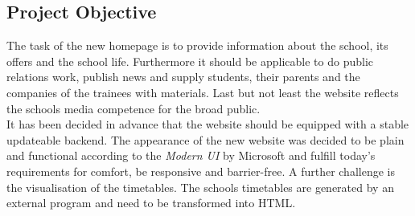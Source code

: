 \subsection{Project Objective}
\label{sec:ProjectObjective}
The task of the new homepage is to provide information about the school, its offers and the school life. 
Furthermore it should be applicable to do public relations work, publish news and supply students, 
their parents and the companies of the trainees with materials. Last but not least the website reflects 
the schools media competence for the broad public.\\

It has been decided in advance that the website should be equipped with a stable updateable backend. 
The appearance of the new website was decided to be plain and functional according to the \textit{Modern UI} 
by Microsoft \cite{METRO} and fulfill today's requirements for comfort, be responsive and barrier-free. 
A further challenge is the visualisation of the timetables. The schools timetables are 
generated by an external program and need to be transformed into HTML.
